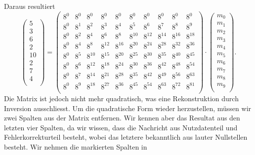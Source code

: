 Daraus resultiert
\[
\begin{pmatrix}
	5 \\ 3 \\ 6 \\ 2 \\ 10 \\ 2 \\ 7 \\ 4 \\
\end{pmatrix}
=
\begin{pmatrix}
	8^0&    8^0&    8^0&    8^0&    8^0&    8^0&    8^0&    8^0&    8^0&    8^0\\
	8^0&	8^1&	8^2&	8^3&	8^4&	8^5&	8^6&	8^7&    8^8&    8^9\\
	8^0&	8^2&	8^4&	8^6&	8^8& 8^{10}& 8^{12}& 8^{14}& 8^{16}& 8^{18}\\
	8^0&	8^4&	8^8& 8^{12}& 8^{16}& 8^{20}& 8^{24}& 8^{28}& 8^{32}& 8^{36}\\
	8^0&	8^5& 8^{10}& 8^{15}& 8^{20}& 8^{25}& 8^{30}& 8^{35}& 8^{40}& 8^{45}\\
	8^0&	8^6& 8^{12}& 8^{18}& 8^{24}& 8^{30}& 8^{36}& 8^{42}& 8^{48}& 8^{54}\\
	8^0&	8^7& 8^{14}& 8^{21}& 8^{28}& 8^{35}& 8^{42}& 8^{49}& 8^{56}& 8^{63}\\
	8^0&	8^9& 8^{18}& 8^{27}& 8^{36}& 8^{45}& 8^{54}& 8^{63}& 8^{72}& 8^{81}\\
\end{pmatrix}
\cdot
\begin{pmatrix}
	m_0 \\ m_1 \\ m_2 \\ m_3 \\ m_4 \\ m_5 \\ m_6 \\ m_7 \\ m_8 \\ m_9 \\
\end{pmatrix}
.
\]
Die Matrix ist jedoch nicht mehr quadratisch, was eine Rekonstruktion durch Inversion ausschliesst. 
Um die quadratische Form wieder herzustellen, müssen wir zwei Spalten aus der Matrix entfernen.
Wir kennen aber das Resultat aus den letzten vier Spalten, da wir wissen, dass die Nachricht aus Nutzdatenteil und Fehlerkorrekturteil besteht, wobei das letztere bekanntlich aus lauter Nullstellen besteht.
Wir nehmen die markierten Spalten in

